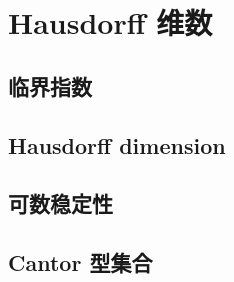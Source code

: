 \section{Hausdorff 维数}
\label{b1:sec:1502}


\subsection{临界指数}
\label{b1:subsec:150201}

\subsection{Hausdorff dimension}
\label{b1:subsec:150202}

\subsection{可数稳定性}
\label{b1:subsec:150203}

\subsection{Cantor 型集合}
\label{b1:subsec:150204}


